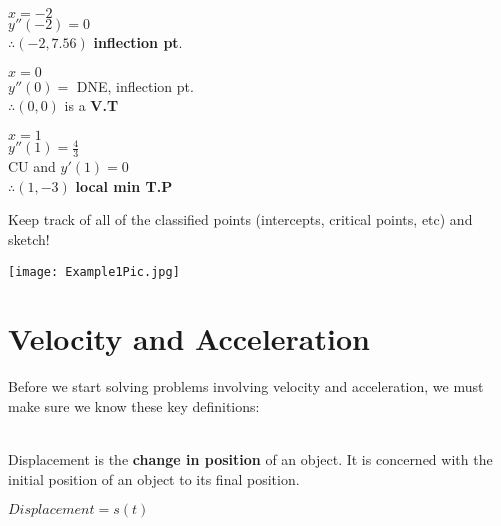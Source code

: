 \documentclass[12pt,fleqn]{book} %
\begin{document}
\begin{multicols}{3}
    \begin{center}
        \underline{$x=-2$} \\
        \vspace*{1mm}
        $y''(-2)=0$ \\
        $\therefore (-2, 7.56)$ \textbf{inflection pt}.
        \columnbreak

        \underline{$x=0$} \\
        \vspace*{1mm}
        $y''(0)=$ DNE, inflection pt. \\
        $\therefore (0, 0)$ is a \textbf{V.T}
        \columnbreak

        \underline{$x=1$} \\
        \vspace*{1mm}
        $y''(1)=\frac{4}{3}$ \\
        CU and $y'(1)=0$ \\
        $\therefore (1, -3)$ \textbf{local min T.P}
    \end{center}
\end{multicols}

\noindent Keep track of all of the classified points (intercepts, critical points, etc) and sketch!

\begin{center}
    \texttt{[image: Example1Pic.jpg]}
\end{center}

\pagebreak


\section{Velocity and Acceleration}

\noindent Before we start solving problems involving velocity and acceleration, we must make sure we know these key definitions:

\vspace*{2mm}

 \\
Displacement is the \textbf{change in position} of an object. It is concerned with the initial position of an object to its final position.

\begin{center}
    {\large $Displacement = s(t)$}

\end{center}
\end{document}
